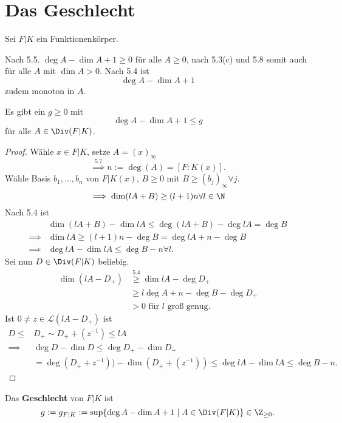 \section{Das Geschlecht}
Sei $F|K$ ein Funktionenkörper.

\begin{bemerkungnr}
    Nach 5.5. $ \deg A - \dim A + 1 \geq 0$ für alle $A \geq 0$, nach 5.3(c) und 5.8 somit auch für alle
    $A$ mit $\dim A > 0$. Nach 5.4 ist 
    $$ \deg A - \dim A +1 $$
    zudem monoton in $A$.
\end{bemerkungnr}

\begin{satz}
    Es gibt ein $g \geq 0$ mit
    $$ \deg A - \dim A + 1 \leq g$$
    für alle $A \in \Div(F|K)$.
\end{satz}
\begin{proof}
    Wähle $x \in F|K$, setze $A = (x)_\infty$
    $$ \stackrel{5.7}{\implies} n := \deg (A) = [F : K(x)].$$
    Wähle Basis $b_1,\ldots,b_n$ von $F|K(x)$, $B \geq 0$ mit $B \geq (b_j)_\infty \forall j$.
    $$ \implies \dim (lA + B) \geq (l+1)n \forall l \in \N$$
    Nach 5.4 ist 
    \begin{align*}
        &\dim (lA+B) - \dim lA \leq \deg (lA + B) - \deg lA = \deg B\\
        \implies& \dim lA \geq (l+1)n - \deg B = \deg lA + n - \deg B\\
        \implies& \deg lA - \dim lA \leq \deg B - n \forall l.
    \end{align*}
    Sei nun $D \in \Div(F|K)$ beliebig.
    \begin{align*}
        \dim (lA - D_+) &\stackrel{5.4}{\geq} \dim lA - \deg D_+\\
        & \geq l \deg A + n - \deg B - \deg D_+\\
        &> 0 \text{ für } l \text{ groß genug.}
    \end{align*}
    Ist $0 \ne z \in \mathcal{L}(lA - D_+)$ ist
    \begin{align*}
        D \leq& D_+ \sim D_+ + (z^{-1}) \leq lA \\
        \implies& \deg D - \dim D \leq \deg D_+ - \dim D_+\\
        &= \deg (D_+ + z^{-1})) - \dim (D_+ + (z^{-1})) \leq \deg lA - \dim lA \leq \deg B -n.
    \end{align*}
\end{proof}

\begin{definition}
    Das \textbf{Geschlecht} von $F|K$ ist
    $$ g := g_{F|K} := \sup \{\deg A - \dim A + 1 \mid A \in \Div(F|K)\} \in \Z_{\geq 0}.$$
\end{definition}

